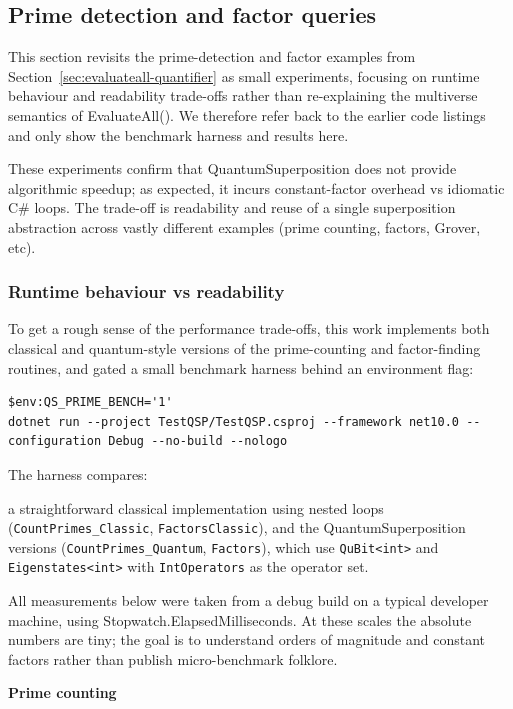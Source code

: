 \documentclass[a4paper,11pt]{article}
\begin{document}
\subsection{Prime detection and factor queries}
\label{sec:prime-factor-case-studies}
This section revisits the prime-detection and factor examples from Section~\ref{sec:evaluateall-quantifier} as small experiments, focusing on runtime behaviour and readability trade-offs rather than re-explaining the multiverse semantics of EvaluateAll(). We therefore refer back to the earlier code listings and only show the benchmark harness and results here.

These experiments confirm that QuantumSuperposition does not provide algorithmic speedup; as expected, it incurs constant-factor overhead vs idiomatic C\# loops. The trade-off is readability and reuse of a single superposition abstraction across vastly different examples (prime counting, factors, Grover, etc).

\subsubsection{Runtime behaviour vs readability}

To get a rough sense of the performance trade-offs, this work implements both classical and quantum-style versions of the prime-counting and factor-finding routines, and gated a small benchmark harness behind an environment flag:

\begin{lstlisting}[style=codeblock]
$env:QS_PRIME_BENCH='1'
dotnet run --project TestQSP/TestQSP.csproj --framework net10.0 --configuration Debug --no-build --nologo
\end{lstlisting}
\par
The harness compares:

a straightforward classical implementation using nested loops
(\texttt{CountPrimes\_Classic}, \texttt{FactorsClassic}), and the
QuantumSuperposition versions (\texttt{CountPrimes\_Quantum},
\texttt{Factors}), which use \texttt{QuBit<int>} and
\texttt{Eigenstates<int>} with \texttt{IntOperators} as the operator set.

All measurements below were taken from a debug build on a typical developer machine, using Stopwatch.ElapsedMilliseconds. At these scales the absolute numbers are tiny; the goal is to understand orders of magnitude and constant factors rather than publish micro-benchmark folklore.

\textbf{Prime counting}
\end{document}

